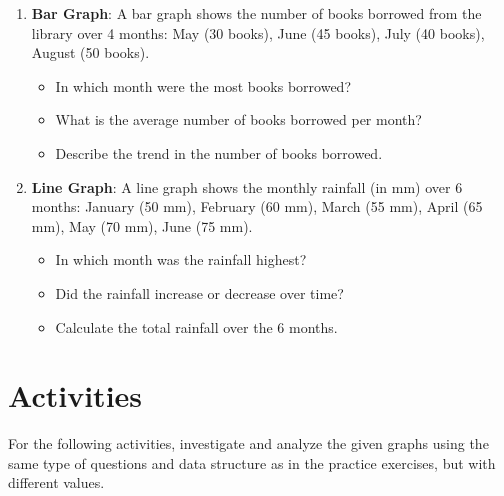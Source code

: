 \begin{enumerate}
    \item \textbf{Bar Graph}: A bar graph shows the number of books borrowed from the library over 4 months: May (30 books), June (45 books), July (40 books), August (50 books).
    \begin{itemize}
        \item In which month were the most books borrowed?
        \item What is the average number of books borrowed per month?
        \item Describe the trend in the number of books borrowed.
    \end{itemize}

    \item \textbf{Line Graph}: A line graph shows the monthly rainfall (in mm) over 6 months: January (50 mm), February (60 mm), March (55 mm), April (65 mm), May (70 mm), June (75 mm).
    \begin{itemize}
        \item In which month was the rainfall highest?
        \item Did the rainfall increase or decrease over time?
        \item Calculate the total rainfall over the 6 months.
    \end{itemize}
\end{enumerate}

\section*{Activities}

For the following activities, investigate and analyze the given graphs using the same type of questions and data structure as in the practice exercises, but with different values.

